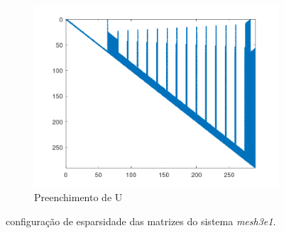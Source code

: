 \documentclass{article}
\begin{document}
\begin{figure}[H]
\begin{subfigure}[b]{0.3\textwidth}
         \centering
         \includegraphics[width=\textwidth]{image/mesh3e1_spyU.png}
         \caption{Preenchimento de U}
         \label{fig:mesh-spyU}
    \end{subfigure}
    \hfill
    \caption{configuração de esparsidade das matrizes do sistema \textit{mesh3e1}.}
    \label{fig:mesh}
\end{figure}
\end{document}
